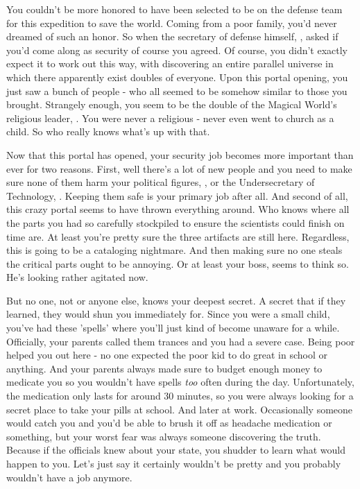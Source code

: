 \documentclass[char]{guildcamp3}
\begin{document}
\name{\cSpecOpTwo{}}



You couldn't be more honored to have been selected to be on the defense team for this expedition to save the world. Coming from a poor family, you'd never dreamed of such an honor. So when the secretary of defense himself, \cPoliOne{\intro}, asked if you'd come along as security of course you agreed. Of course, you didn't exactly expect it to work out this way, with discovering an entire parallel universe in which there apparently exist doubles of everyone. Upon this portal opening, you just saw a bunch of people - who all seemed to be somehow similar to those you brought. Strangely enough, you seem to be the double of the Magical World's religious leader, \cPaladin{\intro}. You were never a religious \pronoun{\human} - never even went to church as a child. So who really knows what's up with that.

Now that this portal has opened, your security job becomes more important than ever for two reasons. First, well there's a lot of new people and you need to make sure none of them harm your political figures, \cPoliOne{}, or the Undersecretary of Technology, \cPoliTwo{}. Keeping them safe is your primary job after all. And second of all, this crazy portal seems to have thrown everything around. Who knows where all the parts you had so carefully stockpiled to ensure the scientists could finish on time are. At least you're pretty sure the three artifacts are still here. Regardless, this is going to be a cataloging nightmare. And then making sure no one steals the critical parts ought to be annoying. Or at least your boss, \cSpecOpOne{\intro} seems to think so. He's looking rather agitated now. 

But no one, not \cPoliOne{} or anyone else, knows your deepest secret. A secret that if they learned, they would shun you immediately for. Since you were a small child, you've had these 'spells' where you'll just kind of become unaware for a while. Officially, your parents called them trances and you had a severe case. Being poor helped you out here - no one expected the poor kid to do great in school or anything. And your parents always made sure to budget enough money to medicate you so you wouldn't have spells \emph{too} often during the day. Unfortunately, the medication only lasts for around 30 minutes, so you were always looking for a secret place to take your pills at school. And later at work. Occasionally someone would catch you and you'd be able to brush it off as headache medication or something, but your worst fear was always someone discovering the truth. Because if the officials knew about your state, you shudder to learn what would happen to you. Let's just say it certainly wouldn't be pretty and you probably wouldn't have a job anymore.
\end{document}

